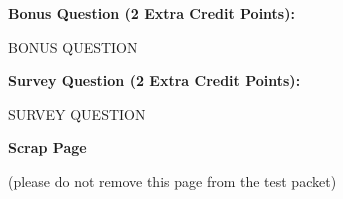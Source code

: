 




\clearpage



{\large \bf Bonus Question (2 Extra Credit Points):}
\vspace{1pc} \vspace{1pc}

BONUS QUESTION  
\vfill

{\large \bf Survey Question (2 Extra Credit Points):}
\vspace{1pc} \vspace{1pc}

SURVEY QUESTION  
\vfill

\clearpage


{\large \bf Scrap Page}

(please do not remove this page from the test packet)



\showpoints



